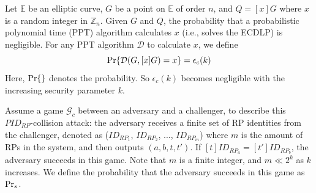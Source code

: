 Let $\mathbb{E}$ be an elliptic curve, %
    $G$ be a point on $\mathbb{E}$ of order $n$,
        and $Q = [x]G$ where $x$ is a random integer in $\mathbb{Z}_n$.
Given $G$ and $Q$,
    the probability that a probabilistic polynomial time (PPT) algorithm calculates $x$ (i.e., solves the ECDLP) is negligible.
For any PPT algorithm $\mathcal{D}$ to calculate $x$, we define
\begin{equation*}
{\rm Pr}\{\mathcal{D}(G, [x]G)=x\} = \epsilon_{c}(k)
\end{equation*}
Here, ${\rm Pr}\{\}$ denotes the probability.
So $\epsilon_{c}(k)$ becomes negligible with the increasing security parameter $k$.

Assume a game $\mathcal{G}_c$ between an adversary and a challenger,
    to describe this $PID_{RP}$-collision attack:
the adversary receives a finite set of RP identities from the challenger,
 denoted as ($ID_{RP_1}$, $ID_{RP_2}$, ..., $ID_{RP_m}$)
 where $m$ is the amount of RPs in the system,
  and then outputs $(a, b, t, t')$.
If $[t]ID_{RP_a}=[t']ID_{RP_b}$, the adversary succeeds in this game.
Note that $m$ is a finite integer, and $m \ll 2^k$ as $k$ increases.
We define the probability that the adversary succeeds in this game as ${\rm Pr}_s$.


